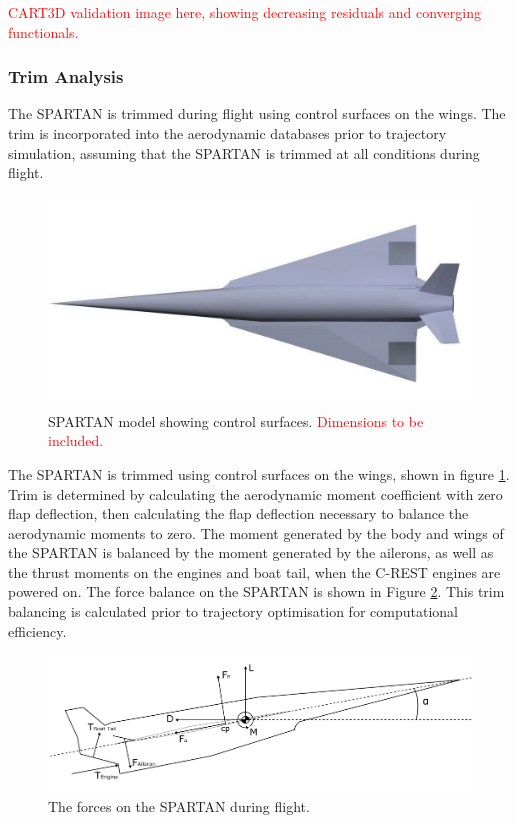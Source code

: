 						
						\textcolor{red}{CART3D validation image here, showing decreasing residuals and converging functionals.}
		
		
		\subsubsection{Trim Analysis}\label{sec:trim}
		
		The SPARTAN is trimmed during flight using control surfaces on the wings. The trim is incorporated into the aerodynamic databases prior to trajectory simulation, assuming that the SPARTAN is trimmed at all conditions during flight. 		
		\begin{figure}[ht]
			\centering
			\includegraphics[width=0.6\linewidth]{figures/3_vehicle_design/SPARTAN_FLAPS}
			\caption{SPARTAN model showing control surfaces. \textcolor{red}{Dimensions to be included.}}
			\label{fig:SPARTAN_FLAPS}
		\end{figure}
		The SPARTAN is trimmed using control surfaces on the wings, shown in figure \ref{fig:SPARTAN_FLAPS}. 
		Trim is determined by calculating the aerodynamic moment coefficient with zero flap deflection, then calculating the flap deflection necessary to balance the aerodynamic moments to zero. The moment generated by the body and wings of the SPARTAN is balanced by the moment generated by the ailerons, as well as the thrust moments on the engines and boat tail, when the C-REST engines are powered on. The force balance on the SPARTAN is shown in Figure \ref{fig:SPARTANForces}. This trim balancing is calculated prior to trajectory optimisation for computational efficiency.
		\begin{figure}[ht]
			\centering
			\includegraphics[width=0.7\linewidth]{figures/3_vehicle_design/SPARTANForces}
			\caption{The forces on the SPARTAN during flight.}
			\label{fig:SPARTANForces}
		\end{figure}
		
